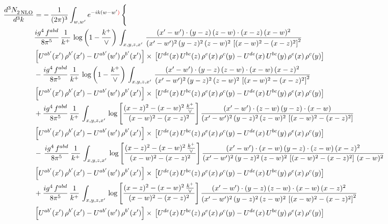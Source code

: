 \documentclass[9pt]{article}
\numberwithin{equation}{section}
\begin{document}
\begin{align}
   \frac{d^{3}N_{2\,\rm NLO}^{\rm}}{d^{3}k}  & =  -\,\frac{1}{(2\pi)^{3}}  \int_{w, w^\prime} e^{-ik(w-w^\prime{\color{red})}}\, \Bigg\{\notag \\ &  \frac{ig^{4}\, f^{abd}}{8\pi^{5}}\, \frac{1}{k^{+}}\,\log{\left(1-\frac{k^{+}}{\vee}\right)}\, \int_{x,y,z,x'}\,\frac{(x'-w')\cdot  (y-z)\, (z-w)\cdot (x-z)\, (x-w)^{2}}{(x'-w')^{2}\, (y-z)^{2}\, (z-w)^{2}\,\left[(x-w)^{2}-(x-z)^{2}\right]^{2}}\, \notag \\ & \left[U^{ab'}(x')\,\rho^{b'}(x')-U^{ab'}(w')\, \rho^{b'}(x')\right]\times\,\left[U^{de}(x)\,U^{bc}(z)\, \rho^{e}(x)\,\rho^{c}(y)-U^{de}(x)\,U^{bc}(y)\,\rho^{e}(x)\,\rho^{c}(y)\right] \notag \\ &   - \frac{ig^{4}\, f^{abd}}{8\pi^{5}}\, \frac{1}{k^{+}}\,\log{\left(1-\frac{k^{+}}{\vee}\right)}\, \int_{x,y,z,x'}\,\frac{(x'-w')\cdot  (y-z)\, (z-w)\cdot (x-w)\, (x-z)^{2}}{(x'-w')^{2}\, (y-z)^{2}\, (z-w)^{2}\,\left[(x-w)^{2}-(x-z)^{2}\right]^{2}}\, \notag \\ & \left[U^{ab'}(x')\,\rho^{b'}(x')-U^{ab'}(w')\, \rho^{b'}(x')\right]\times\,\left[U^{de}(x)\,U^{bc}(z)\, \rho^{e}(x)\,\rho^{c}(y)-U^{de}(x)\,U^{bc}(y)\,\rho^{e}(x)\,\rho^{c}(y)\right] \notag \\
&  + \frac{ig^{4}\, f^{abd}}{8\pi^{5}}\, \frac{1}{k^{+}}\, \int_{x,y,z,x'}\,\log{\left[\frac{(x-z)^{2}-(x-w)^{2}\,\frac{k^{+}}{\vee}}{(x-w)^{2}-(x-z)^{2}}\right]}\,\frac{(x'-w')\cdot (z-w)\, (y-z)\cdot (x-w)}{(x'-w')^{2}\, (y-z)^{2}\, (z-w)^{2}\,\left[(x-w)^{2}-(x-z)^{2}\right]}\, \notag \\ & \left[U^{ab'}(x')\,\rho^{b'}(x')-U^{ab'}(w')\, \rho^{b'}(x')\right]\times\,\left[U^{de}(x)\,U^{bc}(z)\, \rho^{e}(x)\,\rho^{c}(y)-U^{de}(x)\,U^{bc}(y)\,\rho^{e}(x)\,\rho^{c}(y)\right] \notag \\
& -\,\frac{ig^{4}\, f^{abd}}{8\pi^{5}}\, \frac{1}{k^{+}}\, \int_{x,y,z,x'}\,\log{\left[\frac{(x-z)^{2}-(x-w)^{2}\,\frac{k^{+}}{\vee}}{(x-w)^{2}-(x-z)^{2}}\right]}\,\frac{(x'-w')\cdot (x-w)\, (y-z)\cdot(z-w)\,(x-z)^{2}}{(x'-w')^{2}\, (y-z)^{2}\, (z-w)^{2}\,\left[(x-w)^{2}-(x-z)^{2}\right]\,(x-w)^{2}}\, \notag \\ & \left[U^{ab'}(x')\,\rho^{b'}(x')-U^{ab'}(w')\, \rho^{b'}(x')\right]\times\,\left[U^{de}(x)\,U^{bc}(z)\, \rho^{e}(x)\,\rho^{c}(y)-U^{de}(x)\,U^{bc}(y)\,\rho^{e}(x)\,\rho^{c}(y)\right] \notag \\
& +\frac{ig^{4}\, f^{abd}}{8\pi^{5}}\, \frac{1}{k^{+}}\, \int_{x,y,z,x'}\,\log{\left[\frac{(x-z)^{2}-(x-w)^{2}\,\frac{k^{+}}{\vee}}{(x-w)^{2}-(x-z)^{2}}\right]}\,\frac{(x'-w')\cdot  (y-z)\, (z-w)\cdot (x-w)\, (x-z)^{2}}{(x'-w')^{2}\, (y-z)^{2}\, (z-w)^{2}\,\left[(x-w)^{2}-(x-z)^{2}\right]^{2}}\, \notag \\ & \left[U^{ab'}(x')\,\rho^{b'}(x')-U^{ab'}(w')\, \rho^{b'}(x')\right]\times\,\left[U^{de}(x)\,U^{bc}(z)\, \rho^{e}(x)\,\rho^{c}(y)-U^{de}(x)\,U^{bc}(y)\,\rho^{e}(x)\,\rho^{c}(y)\right] \notag \\

\end{align}
\end{document}
